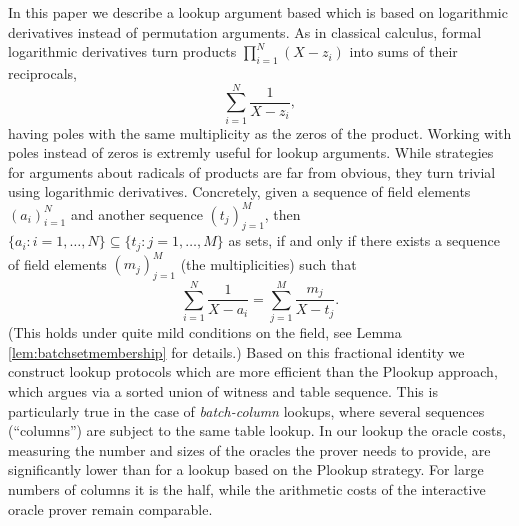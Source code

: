 \documentclass[11pt]{article}
\theoremstyle{definition}
\theoremstyle{remark}
\begin{document}
In this paper we describe a lookup argument based which is based on logarithmic derivatives instead of permutation arguments. 
As in classical calculus, formal logarithmic derivatives turn products $\prod_{i=1}^N (X - z_i)$ into sums of their reciprocals, 
\[
\sum_{i=1}^N \frac{1}{X - z_i},
\]
having poles with the same multiplicity as the zeros of the product.
Working with poles instead of zeros is extremly useful for lookup arguments.
While strategies for arguments about radicals of products are far from obvious, they turn trivial using logarithmic derivatives.
Concretely, given a sequence of field elements $(a_i)_{i=1}^N$ and another sequence $(t_j)_{j=1}^M$, then $\{a_i: i =1,\ldots, N\}\subseteq \{t_j : j=1,\ldots, M\}$ as sets, if and only if there exists a sequence of field elements $(m_j)_{j=1}^M$ (the multiplicities) such that
\begin{equation*}
\label{e:intro:lookup:eq}
\sum_{i=1}^N \frac{1}{X - a_i}  = \sum_{j=1}^M \frac{m_j}{X - t_j}.
\end{equation*}
 (This holds under quite mild conditions on the field, see Lemma \ref{lem:batchsetmembership} for details.)
Based on this fractional identity we construct lookup protocols which are more  efficient than the Plookup approach, which argues via a sorted union of witness and table sequence.
This is particularly true in the case of \textit{batch-column} lookups, where several sequences (``columns'') are subject to the same table lookup.
In our lookup the oracle costs, measuring the number and sizes of the oracles the prover needs to provide, are significantly lower than for a lookup based on the Plookup strategy.
For large numbers of columns it is the half, while the arithmetic costs of the interactive oracle prover remain comparable.
\end{document}
